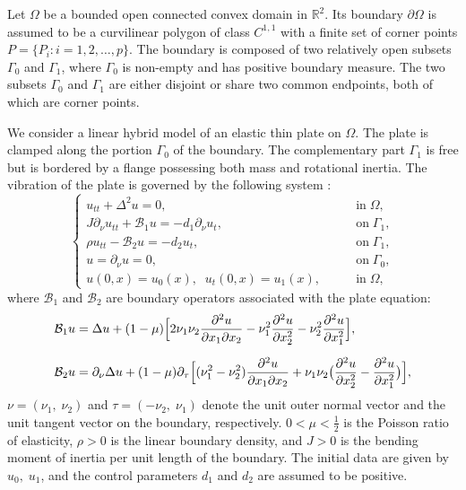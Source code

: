 \documentclass[twoside]{article}
\theoremstyle{noparens}
\theoremstyle{definition}
\numberwithin{equation}{section}
\numberwithin{figure}{section}
\begin{document}
Let  $\Omega$ be  a bounded open connected convex domain in $\mathbb{R}^2$.
Its boundary $\partial\Omega$ is assumed to be a curvilinear polygon of class
$C^{1,1}$  with a finite set of corner points   $P = \{P_i : i = 1, 2, \dots, p\}$. The boundary
is composed of two relatively open subsets $\Gamma_0$ and $\Gamma_1$, where
$\Gamma_0$ is non-empty and has positive boundary measure. The  two subsets $\Gamma_0$ and $\Gamma_1$ are either disjoint or share two common endpoints, both of which are corner points.

We consider a linear hybrid model of an elastic thin plate on $\Omega$.
The plate is clamped along the portion $\Gamma_0$  of the boundary. The complementary part $\Gamma_1$ is free  but is bordered by a flange possessing both mass and rotational inertia.  The vibration  of the plate is governed by the following system \cite{JE}:
\begin{equation}\label{eq1}
	\begin{cases}
		u_{tt}+\Delta^2 u = 0, \qquad&\mbox{in}\;\Omega,\\
		J\partial_{\nu}u_{tt} + \mathcal{B}_1 u = -d_1 \partial_{\nu}u_t,&\text{on}\; \Gamma_1 ,\\
		\rho u_{tt} - \mathcal{B}_2 u = -d_2 u_t, &\text{on}\; \Gamma_1 ,\\
		u=\partial_{\nu} u = 0, &\text{on}\; \Gamma_0,\\
		u(0,x) = u_0(x),\;\;u_t(0,x) = u_1(x), \qquad&\mbox{in}\; \Omega,
	\end{cases}
\end{equation}
where $\mathcal{B}_{1}$ and  $\mathcal{B}_{2}$ are boundary operators associated with the plate equation:
\begin{align*}\displaystyle
	&\mathcal{B}_{1}u=\Delta u+(1-\mu)\Big[2\nu_{1}\nu_{2}\frac{\partial^{2}u}{\partial x_{1}\partial x_{2}}-\nu_{1}^{2}\frac{\partial^{2}u}{\partial x_{2}^{2}}-\nu_{2}^{2}\frac{\partial^{2}u}{\partial x_{1}^{2}}\Big],\\ \noalign{\medskip}  \displaystyle
	&\mathcal{B}_{2}u=\partial_{\nu}\Delta u+(1-\mu)\partial_{\tau}\Big[(\nu_{1}^{2}-\nu_{2}^{2})\frac{\partial^{2}u}{\partial x_{1}\partial x_{2}}+ \nu_{1}\nu_{2}\big(\frac{\partial^{2}u}{\partial x_{2}^{2}}-\frac{\partial^{2}u}{\partial x_{1}^{2}}\big)\Big],
\end{align*}
$\nu=(\nu_{1},\;\nu_{2})$ and $\tau=(-\nu_{2},\;\nu_{1})$ denote the unit outer normal vector and the unit tangent vector on the boundary, respectively. $ 0< \mu <\frac{1}{2}$ is the Poisson ratio of elasticity, $\rho>0$  is the linear boundary
density, and $J > 0 $ is the bending moment of inertia per unit length of the boundary.
The initial data are given   by $ u_0,\; u_1$, and the control parameters $d_1$ and $d_2$  are assumed to be positive.
\end{document}
